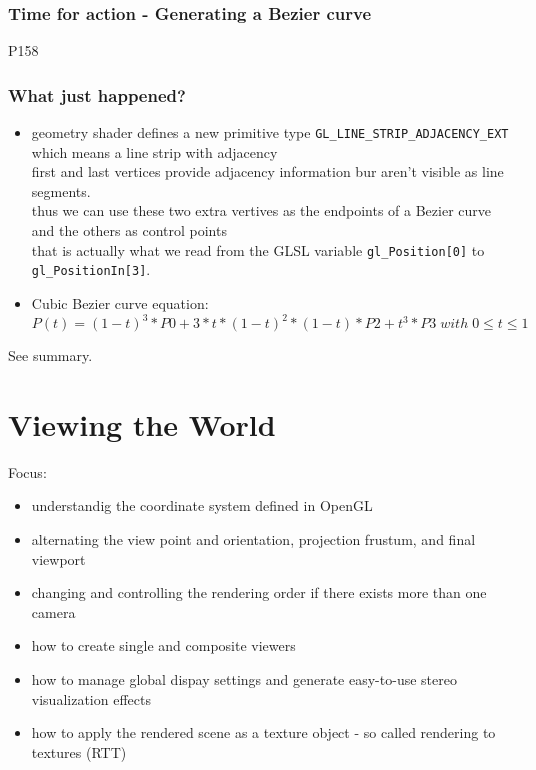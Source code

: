 \documentclass[a4paper,12pt]{book}
\begin{document}
\subsection{Time for action - Generating a Bezier curve}
P158
\subsection{What just happened?}
\begin{itemize}
\item geometry shader defines a new primitive type \verb|GL_LINE_STRIP_ADJACENCY_EXT| which means a line strip with adjacency\\
\textrightarrow first and last vertices provide adjacency information bur aren't visible as line segments.\\
\textrightarrow thus we can use these two extra vertives as the endpoints of a Bezier curve and the others as control points\\
\textrightarrow that is actually what we read from the GLSL variable \verb|gl_Position[0]| to \verb|gl_PositionIn[3]|.\\

\item Cubic Bezier curve equation:\\
$P(t) = (1-t)^3 *P0 + 3 * t * (1-t)^2 * (1-t)*P2 + t^3 *P3 \; with \;  0 \leq t \leq 1$
\end{itemize}
See summary.
\chapter{Viewing the World}
Focus:
\begin{itemize}
\item understandig the coordinate system defined in OpenGL
\item alternating the view point and orientation, projection frustum, and final viewport
\item changing and controlling the rendering order if there exists more than one camera
\item how to create single and composite viewers
\item how to manage global dispay settings and generate easy-to-use stereo visualization effects
\item how to apply the rendered scene as a texture object - so called rendering to textures (RTT)
\end{itemize}
\end{document}
